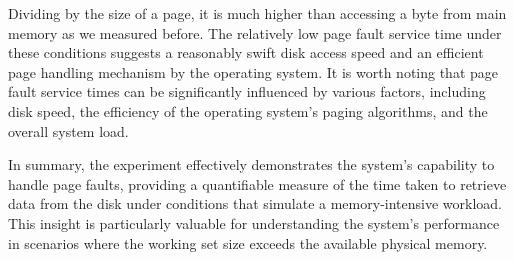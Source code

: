 Dividing by the size of a page, it is much higher than accessing a byte from main memory as we measured before.
The relatively low page fault service time under these conditions suggests a reasonably swift disk access speed and an efficient page handling mechanism by the operating system. It is worth noting that page fault service times can be significantly influenced by various factors, including disk speed, the efficiency of the operating system's paging algorithms, and the overall system load.

In summary, the experiment effectively demonstrates the system's capability to handle page faults, providing a quantifiable measure of the time taken to retrieve data from the disk under conditions that simulate a memory-intensive workload. This insight is particularly valuable for understanding the system's performance in scenarios where the working set size exceeds the available physical memory.